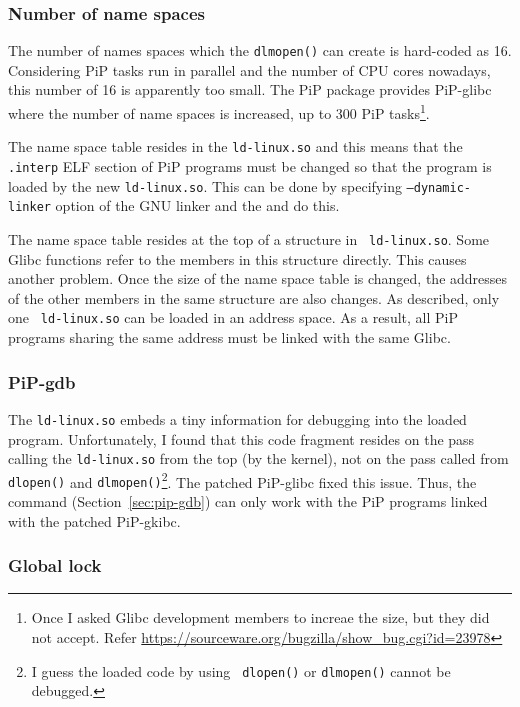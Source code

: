 \subsubsection{Number of name spaces}

The number of names spaces which the {\tt dlmopen()} can create is
hard-coded as 16. Considering PiP tasks run in parallel and the number
of CPU cores nowadays, this number of 16 is apparently too small. The
PiP package provides PiP-glibc where the number of name spaces is
increased, up to 300 PiP tasks\footnote{Once I asked Glibc
development members to increae the size, but they did not accept. Refer
\url{https://sourceware.org/bugzilla/show_bug.cgi?id=23978}}. 

The name space table resides in the {\tt ld-linux.so} and this means
that the {\tt .interp} ELF section of PiP programs must be changed so
that the program is loaded by the new {\tt ld-linux.so}. This can be
done by specifying {\tt --dynamic-linker} option of the GNU linker and
the  and  do this.

The name space table resides at the top of a structure in {\tt
  ld-linux.so}. Some Glibc functions refer to the members in this
structure directly. This causes another problem. Once the size of the
name space table is changed, the addresses of the other members in the
same structure are also changes. As described, only one {\tt
  ld-linux.so} can be loaded in an address space. As a result, all PiP 
programs sharing the same address must be linked with the same Glibc. 

\subsubsection{PiP-gdb}

The {\tt ld-linux.so} embeds a tiny information for debugging into the
loaded program. Unfortunately, I found that this code fragment
resides on the pass calling the {\tt ld-linux.so} from the
top (by the kernel), not on the pass called from {\tt dlopen()}
  and {\tt dlmopen()}\footnote{I guess the loaded code by using {\tt
    dlopen()} or {\tt dlmopen()} cannot be debugged.}. The patched
  PiP-glibc fixed this issue. Thus, the  command
  (Section~\ref{sec:pip-gdb}) can only work with 
  the PiP programs linked with the patched PiP-gkibc.

\subsubsection{Global lock}


